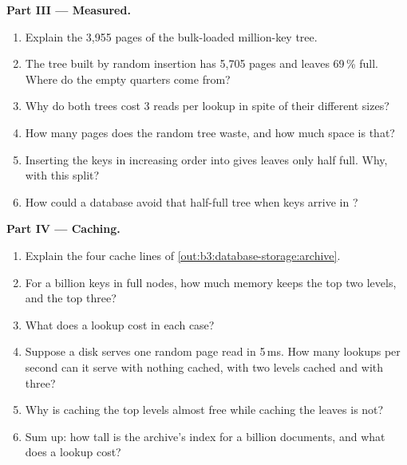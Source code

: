 \begin{problem}
\medskip\noindent\textbf{Part III --- Measured.}
\begin{enumerate}[resume]
  \item Explain the 3,955 pages of the bulk-loaded million-key tree.
  \item The tree built by random insertion has 5,705 pages and leaves 69\,\% full. Where do the empty quarters come from?
  \item Why do both trees cost 3 reads per lookup in spite of their different sizes?
  \item How many pages does the random tree waste, and how much space is that?
  \item Inserting the keys in increasing order into  gives leaves only half full. Why, with this split?
  \item How could a database avoid that half-full tree when keys arrive in ?
\end{enumerate}

\medskip\noindent\textbf{Part IV --- Caching.}
\begin{enumerate}[resume]
  \item Explain the four cache lines of \cref{out:b3:database-storage:archive}.
  \item For a billion keys in full nodes, how much memory keeps the top two levels, and the top three?
  \item What does a lookup cost in each case?
  \item Suppose a disk serves one random page read in 5\,ms. How many lookups per second can it serve with nothing cached, with two levels cached and with three?
  \item Why is caching the top levels almost free while caching the leaves is not?
  \item Sum up: how tall is the archive's index for a billion documents, and what does a lookup cost?
\end{enumerate}
\end{problem}
